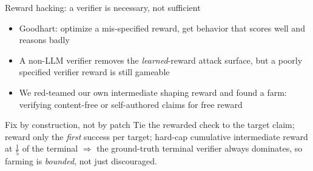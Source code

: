 \documentclass[aspectratio=169]{beamer}
\begin{document}
\begin{frame}{Reward hacking: a verifier is necessary, not sufficient}
  \begin{itemize}
    \item Goodhart: optimize a mis-specified reward, get behavior that scores well and reasons badly
    \item A non-LLM verifier removes the \emph{learned}-reward attack surface, but a poorly specified verifier reward is still gameable
    \item We red-teamed our own intermediate shaping reward and found a farm: verifying content-free or self-authored claims for free reward
  \end{itemize}
  \begin{alertblock}{Fix by construction, not by patch}
    Tie the rewarded check to the target claim; reward only the \emph{first} success per target;
    hard-cap cumulative intermediate reward at $\tfrac{1}{5}$ of the terminal $\Rightarrow$ the ground-truth
    terminal verifier always dominates, so farming is \emph{bounded}, not just discouraged.
  \end{alertblock}
\end{frame}
\end{document}
